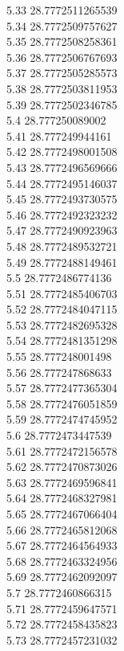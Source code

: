 {5.33	28.7772511265539\\
5.34	28.7772509757627\\
5.35	28.7772508258361\\
5.36	28.7772506767693\\
5.37	28.7772505285573\\
5.38	28.7772503811953\\
5.39	28.7772502346785\\
5.4	28.777250089002\\
5.41	28.777249944161\\
5.42	28.7772498001508\\
5.43	28.7772496569666\\
5.44	28.7772495146037\\
5.45	28.7772493730575\\
5.46	28.7772492323232\\
5.47	28.7772490923963\\
5.48	28.7772489532721\\
5.49	28.7772488149461\\
5.5	28.7772486774136\\
5.51	28.7772485406703\\
5.52	28.7772484047115\\
5.53	28.7772482695328\\
5.54	28.7772481351298\\
5.55	28.777248001498\\
5.56	28.777247868633\\
5.57	28.7772477365304\\
5.58	28.7772476051859\\
5.59	28.7772474745952\\
5.6	28.7772473447539\\
5.61	28.7772472156578\\
5.62	28.7772470873026\\
5.63	28.7772469596841\\
5.64	28.7772468327981\\
5.65	28.7772467066404\\
5.66	28.7772465812068\\
5.67	28.7772464564933\\
5.68	28.7772463324956\\
5.69	28.7772462092097\\
5.7	28.7772460866315\\
5.71	28.7772459647571\\
5.72	28.7772458435823\\
5.73	28.7772457231032\\
}
